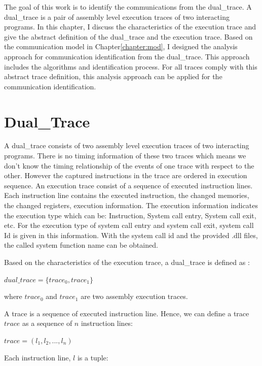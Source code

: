 


\label{chapter:alo}
The goal of this work is to identify the communications from the dual\_trace. A dual\_trace is a pair of assembly level execution traces of two interacting programs. In this chapter, I discuss the characteristics of the execution trace and give the abstract definition of the dual\_trace and the execution trace. Based on the communication model in Chapter\ref{chapter:mod}, I designed the analysis approach for communication identification from the dual\_trace. This approach includes the algorithms and identification process.  For all traces comply with this abstract trace definition, this analysis approach can be applied for the communication identification.

\section{Dual\_Trace}
A dual\_trace consists of two assembly level execution traces of two interacting programs. There is no timing information of these two traces which means we don't know the timing relationship of the events of one trace with respect to the other. However the captured instructions in the trace are ordered in execution sequence. An execution trace consist of a sequence of executed instruction lines. Each instruction line contains the executed instruction, the changed memories, the changed registers, execution information. The execution information indicates the execution type which can be: Instruction, System call entry, System call exit, etc. For the execution type of system call entry and system call exit, system call Id is given in this information. With the system call id and the provided .dll files, the called system function name can be obtained. 

Based on the characteristics of the execution trace, a dual\_trace is defined as :

$dual\_trace = \lbrace trace_0, trace_1\rbrace$

where $trace_0$ and $trace_1$ are two assembly execution traces.

A trace is a sequence of executed instruction line. Hence, we can define a trace $trace$ as a sequence of $n$ instruction lines:

$ trace = (l_1, l_2, ..., l_n)$ 

Each instruction line, $l$ is a tuple:

